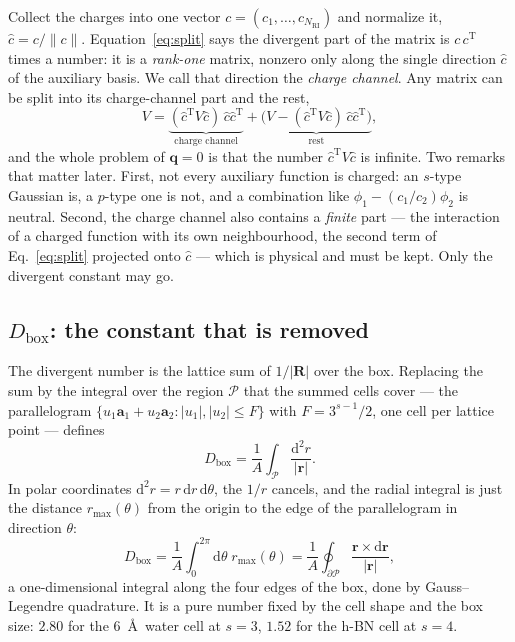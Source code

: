 \documentclass[11pt,a4paper]{article}
\newcommand{\br}{\mathbf{r}}
\newcommand{\bR}{\mathbf{R}}
\newcommand{\bq}{\mathbf{q}}
\newcommand{\dd}{\mathrm{d}}
\newcommand{\Tr}{\mathrm{T}}
\begin{document}
Collect the charges into one vector $c = (c_1,\dots,c_{N_\mathrm{RI}})$ and normalize it,
$\hat c = c/\|c\|$. Equation~\eqref{eq:split} says the divergent part of the matrix is
$c\,c^\Tr$ times a number: it is a \emph{rank-one} matrix, nonzero only along the single
direction $\hat c$ of the auxiliary basis. We call that direction the \emph{charge channel}.
Any matrix can be split into its charge-channel part and the rest,
\begin{equation}
  V = \underbrace{(\hat c^\Tr V\hat c)\,\hat c\hat c^\Tr}_{\text{charge channel}}
  + \underbrace{\big(V - (\hat c^\Tr V\hat c)\,\hat c\hat c^\Tr\big)}_{\text{rest}},
\end{equation}
and the whole problem of $\bq=0$ is that the number $\hat c^\Tr V\hat c$ is infinite. Two
remarks that matter later. First, not every auxiliary function is charged: an $s$-type
Gaussian is, a $p$-type one is not, and a combination like $\phi_1 - (c_1/c_2)\phi_2$ is
neutral. Second, the charge channel also contains a \emph{finite} part --- the interaction of a
charged function with its own neighbourhood, the second term of Eq.~\eqref{eq:split} projected
onto $\hat c$ --- which is physical and must be kept. Only the divergent constant may go.

\subsection{$D_\mathrm{box}$: the constant that is removed}

The divergent number is the lattice sum of $1/|\bR|$ over the box. Replacing the sum by the
integral over the region $\mathcal P$ that the summed cells cover --- the parallelogram
$\{u_1\mathbf a_1+u_2\mathbf a_2 : |u_1|,|u_2|\le F\}$ with $F = 3^{s-1}/2$, one cell per
lattice point --- defines
\begin{equation}
  D_\mathrm{box} = \frac{1}{A}\int_{\mathcal P}\frac{\dd^2 r}{|\br|} .
  \label{eq:Dbox}
\end{equation}
In polar coordinates $\dd^2r = r\,\dd r\,\dd\theta$, the $1/r$ cancels, and the radial
integral is just the distance $r_{\max}(\theta)$ from the origin to the edge of the
parallelogram in direction $\theta$:
\begin{equation}
  D_\mathrm{box} = \frac{1}{A}\int_0^{2\pi}\dd\theta\; r_{\max}(\theta)
  = \frac{1}{A}\oint_{\partial\mathcal P}\frac{\br\times\dd\br}{|\br|},
\end{equation}
a one-dimensional integral along the four edges of the box, done by Gauss--Legendre quadrature.
It is a pure number fixed by the cell shape and the box size: $2.80$ for the $6$~\AA\ water cell
at $s=3$, $1.52$ for the h-BN cell at $s=4$.
\end{document}

